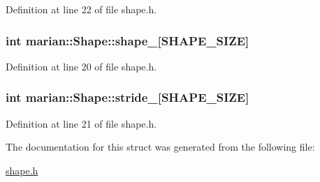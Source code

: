 Definition at line 22 of file shape.\+h.

\subsubsection[{\texorpdfstring{shape\+\_\+}{shape_}}]{\setlength{\rightskip}{0pt plus 5cm}int marian\+::\+Shape\+::shape\+\_\+\mbox{[}{\bf S\+H\+A\+P\+E\+\_\+\+S\+I\+ZE}\mbox{]}}\hypertarget{structmarian_1_1Shape_a87dd6e1cf78a4bc46d80c63d14f9d2de}{}\label{structmarian_1_1Shape_a87dd6e1cf78a4bc46d80c63d14f9d2de}


Definition at line 20 of file shape.\+h.

\subsubsection[{\texorpdfstring{stride\+\_\+}{stride_}}]{\setlength{\rightskip}{0pt plus 5cm}int marian\+::\+Shape\+::stride\+\_\+\mbox{[}{\bf S\+H\+A\+P\+E\+\_\+\+S\+I\+ZE}\mbox{]}}\hypertarget{structmarian_1_1Shape_a960bb2f1f175e64fa00baa56891aafcb}{}\label{structmarian_1_1Shape_a960bb2f1f175e64fa00baa56891aafcb}


Definition at line 21 of file shape.\+h.



The documentation for this struct was generated from the following file\+:\begin{DoxyCompactItemize}
\item 
\hyperlink{shape_8h}{shape.\+h}\end{DoxyCompactItemize}
